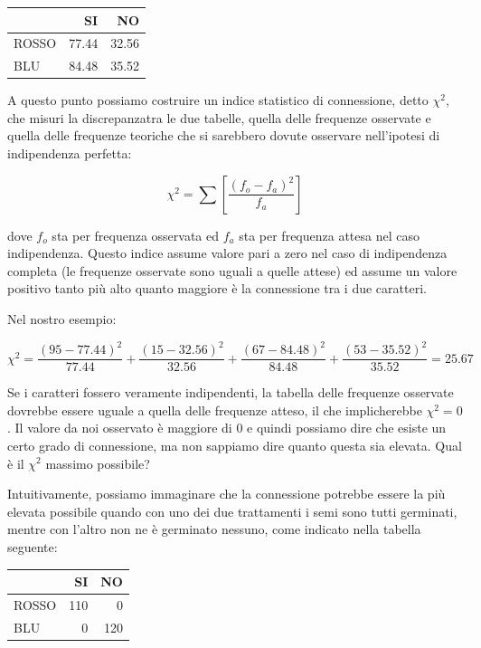 \documentclass[
  12pt,
]{book}
\begin{document}
\begin{longtable}[]{@{}lrr@{}}
\toprule()
& SI & NO \\
\midrule()
\endhead
ROSSO & 77.44 & 32.56 \\
BLU & 84.48 & 35.52 \\
\bottomrule()
\end{longtable}

A questo punto possiamo costruire un indice statistico di connessione, detto \(\chi^2\), che misuri la discrepanzatra le due tabelle, quella delle frequenze osservate e quella delle frequenze teoriche che si sarebbero dovute osservare nell'ipotesi di indipendenza perfetta:

\[\chi ^2  = \sum \left[ \frac{\left( {f_o  - f_a } \right)^2 }{f_a } \right]\]

dove \(f_o\) sta per frequenza osservata ed \(f_a\) sta per frequenza attesa nel caso indipendenza. Questo indice assume valore pari a zero nel caso di indipendenza completa (le frequenze osservate sono uguali a quelle attese) ed assume un valore positivo tanto più alto quanto maggiore è la connessione tra i due caratteri.

Nel nostro esempio:

\[\chi^2  = \frac{\left( {95  - 77.44 } \right)^2 }{77.44 } + \frac{\left( {15  - 32.56 } \right)^2 }{32.56 } + \frac{\left( {67  - 84.48 } \right)^2 }{84.48 } + \frac{\left( {53  - 35.52 } \right)^2 }{35.52 } = 25.67\]

Se i caratteri fossero veramente indipendenti, la tabella delle frequenze osservate dovrebbe essere uguale a quella delle frequenze atteso, il che implicherebbe \(\chi^2 = 0\). Il valore da noi osservato è maggiore di 0 e quindi possiamo dire che esiste un certo grado di connessione, ma non sappiamo dire quanto questa sia elevata. Qual è il \(\chi^2\) massimo possibile?

Intuitivamente, possiamo immaginare che la connessione potrebbe essere la più elevata possibile quando con uno dei due trattamenti i semi sono tutti germinati, mentre con l'altro non ne è germinato nessuno, come indicato nella tabella seguente:

\begin{longtable}[]{@{}lrr@{}}
\toprule()
& SI & NO \\
\midrule()
\endhead
ROSSO & 110 & 0 \\
BLU & 0 & 120 \\
\bottomrule()
\end{longtable}
\end{document}
